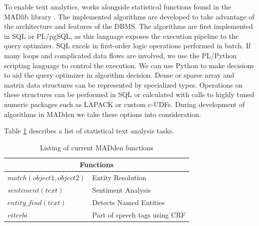 






To enable text analytics, {\system} works alongside statistical
functions found in the MADlib library \cite{Cohen:2009:MSN:1687553.1687576}.
The implemented algorithms are developed to take advantage of the 
architecture and features of the DBMS.
The algorithms are first implemented in SQL or PL/pgSQL, as this language
exposes the execution pipeline to the query optimizer. 
SQL excels in first-order logic operations performed in batch.
If many loops and complicated data flows are involved, we use the PL/Python 
scripting language to control the execution.
We can use Python to make decisions to aid the query optimizer in algorithm
decision.
Dense or sparse array and matrix data structures can be represented
by specialized types. Operations on these structures can be performed in
SQL or calculated with calls to highly tuned numeric packages such as LAPACK
or custom c-UDFs.
During development of algorithms in MADden we take these options 
into consideration.

Table \ref{tab:madfunct} describes a list of statistical text 
analysis tasks.

\begin{table} 
\begin{center} 
\begin{tabular}{|l|l|} 
\hline 
\multicolumn{2}{|c|}{Functions}\\ 
\hline 
$match(object1, object2)$ & Entity Resolution\\ 
\hline 
$sentiment(text)$ & Sentiment Analysis\\ 
\hline 
$entity\_find(text)$ & Detects Named Entities\\ 
\hline 
$viterbi$ & Part of speech tags using CRF  \\ 
\hline 
\end{tabular} 
\end{center} 
\caption{Listing of current MADden functions} 
\label{tab:madfunct} 
\end{table} 



